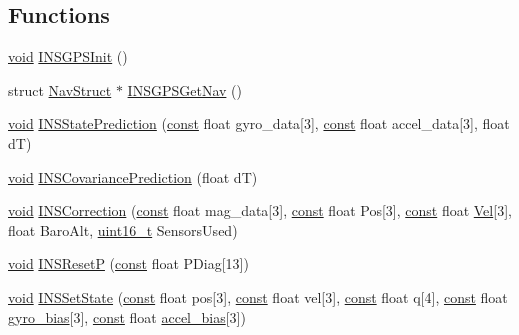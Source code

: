\subsection*{Functions}
\begin{DoxyCompactItemize}
\item 
\hyperlink{group___n_a_m_e_ga18028b8badbf1ea7e704ccac3c488e82}{void} \hyperlink{group___i_n_s_g_p_s_ga37848fdaaf6ee155638ba5bb1521fffe}{I\-N\-S\-G\-P\-S\-Init} ()
\item 
struct \hyperlink{struct_nav_struct}{Nav\-Struct} $\ast$ \hyperlink{group___i_n_s_g_p_s_gae4fd8ec7bfe1edbff24eed9b3c52b3d7}{I\-N\-S\-G\-P\-S\-Get\-Nav} ()
\item 
\hyperlink{group___n_a_m_e_ga18028b8badbf1ea7e704ccac3c488e82}{void} \hyperlink{group___i_n_s_g_p_s_ga57adeb4fc2f14e36f70531b52bd28193}{I\-N\-S\-State\-Prediction} (\hyperlink{group___n_a_m_e_ga7ae6d0e43244213b34de2c2b9aa30da6}{const} float gyro\-\_\-data\mbox{[}3\mbox{]}, \hyperlink{group___n_a_m_e_ga7ae6d0e43244213b34de2c2b9aa30da6}{const} float accel\-\_\-data\mbox{[}3\mbox{]}, float d\-T)
\item 
\hyperlink{group___n_a_m_e_ga18028b8badbf1ea7e704ccac3c488e82}{void} \hyperlink{group___i_n_s_g_p_s_gab680361c7bb4c9f7a0c06d189dc9d4a1}{I\-N\-S\-Covariance\-Prediction} (float d\-T)
\item 
\hyperlink{group___n_a_m_e_ga18028b8badbf1ea7e704ccac3c488e82}{void} \hyperlink{group___i_n_s_g_p_s_gaade300e6df3b427d5bde882fa2f7c93f}{I\-N\-S\-Correction} (\hyperlink{group___n_a_m_e_ga7ae6d0e43244213b34de2c2b9aa30da6}{const} float mag\-\_\-data\mbox{[}3\mbox{]}, \hyperlink{group___n_a_m_e_ga7ae6d0e43244213b34de2c2b9aa30da6}{const} float Pos\mbox{[}3\mbox{]}, \hyperlink{group___n_a_m_e_ga7ae6d0e43244213b34de2c2b9aa30da6}{const} float \hyperlink{pios__opahrs__proto_8h_a887ce86476d7dc3193741e1e01fd2652}{Vel}\mbox{[}3\mbox{]}, float Baro\-Alt, \hyperlink{stdint_8h_a273cf69d639a59973b6019625df33e30}{uint16\-\_\-t} Sensors\-Used)
\item 
\hyperlink{group___n_a_m_e_ga18028b8badbf1ea7e704ccac3c488e82}{void} \hyperlink{group___i_n_s_g_p_s_ga9afce3083f9ab90a40d620dde634f901}{I\-N\-S\-Reset\-P} (\hyperlink{group___n_a_m_e_ga7ae6d0e43244213b34de2c2b9aa30da6}{const} float P\-Diag\mbox{[}13\mbox{]})
\item 
\hyperlink{group___n_a_m_e_ga18028b8badbf1ea7e704ccac3c488e82}{void} \hyperlink{group___i_n_s_g_p_s_ga33be75afa533a464a8571e241a6caa10}{I\-N\-S\-Set\-State} (\hyperlink{group___n_a_m_e_ga7ae6d0e43244213b34de2c2b9aa30da6}{const} float pos\mbox{[}3\mbox{]}, \hyperlink{group___n_a_m_e_ga7ae6d0e43244213b34de2c2b9aa30da6}{const} float vel\mbox{[}3\mbox{]}, \hyperlink{group___n_a_m_e_ga7ae6d0e43244213b34de2c2b9aa30da6}{const} float q\mbox{[}4\mbox{]}, \hyperlink{group___n_a_m_e_ga7ae6d0e43244213b34de2c2b9aa30da6}{const} float \hyperlink{pios__opahrs__proto_8h_a2d2f11a33fd907b7df5b7b6a7f44e689}{gyro\-\_\-bias}\mbox{[}3\mbox{]}, \hyperlink{group___n_a_m_e_ga7ae6d0e43244213b34de2c2b9aa30da6}{const} float \hyperlink{pios__opahrs__proto_8h_a0ce75f6556b56ffcfee6db75c310c8d8}{accel\-\_\-bias}\mbox{[}3\mbox{]})

\end{DoxyCompactItemize}
